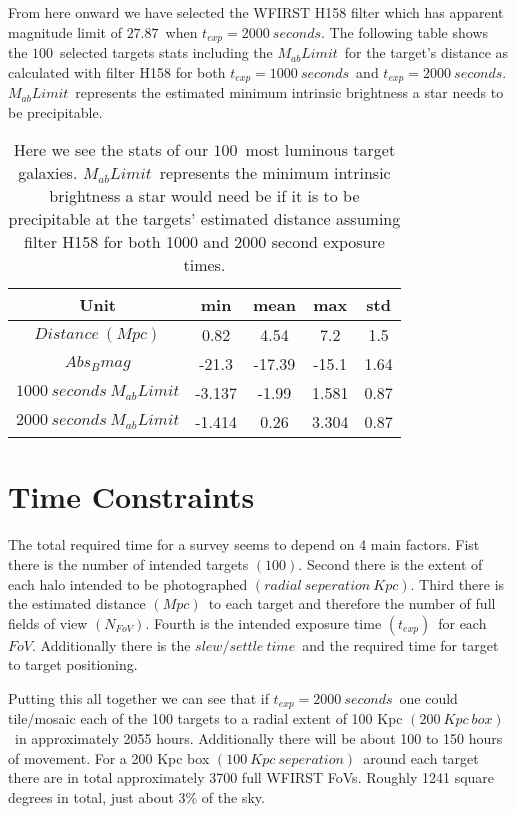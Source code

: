 \documentclass[11pt,a4paper,fleqn,notitlepage,oneside]{article}
\begin{document}
		From here onward we have selected the WFIRST H158 filter which has apparent magnitude limit of $27.87$\ when $t_{exp}=2000\ seconds$.
		The following table shows the $100$\ selected targets stats including the $M_{ab}Limit$\ for the target's distance as calculated with filter H158 for both $t_{exp}=1000\ seconds$\ and $t_{exp}=2000\ seconds$.
		$M_{ab}Limit$\ represents the estimated minimum intrinsic brightness a star needs to be precipitable.

		\begin{table}[H]\centering
			\begin{tabular}{||c|cccc||}%
				\hline 
				Unit & min & mean & max & std \\
				\midrule[1.5pt]
				$Distance\ (Mpc)$ & 0.82 & 4.54 & 7.2 & 1.5 \\
				$Abs_{B}mag$ & -21.3 & -17.39 & -15.1 & 1.64 \\
				$1000\ seconds\ M_{ab}Limit$ & -3.137 & -1.99 & 1.581 & 0.87 \\
				$2000\ seconds\ M_{ab}Limit$ & -1.414 & 0.26 & 3.304 & 0.87 \\
			\hline
			\end{tabular}
		\caption{
			Here we see the stats of our $100$\ most luminous target galaxies.
			$M_{ab}Limit$\ represents the minimum intrinsic brightness a star would need be if it is to be precipitable at the targets' estimated distance assuming filter H158 for both 1000 and 2000 second exposure times.
			}
		\label{tab:3}
		\end{table}

\section{Time Constraints} %
	\label{sec:time_constraints}
	The total required time for a survey seems to depend on 4 main factors.
	Fist there is the number of intended targets $(100)$.
	Second there is the extent of each halo intended to be photographed $(radial\ seperation\ Kpc)$.
	Third there is the estimated distance $(Mpc)$\ to each target and therefore the number of full fields of view $(N_{FoV})$.
	Fourth is the intended exposure time $(t_{exp})$\ for each $FoV$.
	Additionally there is the $slew/settle\ time$\ and the required time for target to target positioning.

	Putting this all together we can see that if $t_{exp}=2000\ seconds$\ one could tile/mosaic each of the 100 targets to a radial extent of 100 Kpc $(200\ Kpc\ box)$\ in approximately 2055 hours.
	Additionally there will be about 100 to 150 hours of movement.
	For a 200 Kpc box $(100\ Kpc\ seperation)$\ around each target there are in total approximately 3700 full WFIRST FoVs.
	Roughly 1241 square degrees in total, just about 3\% of the sky.
\end{document}
